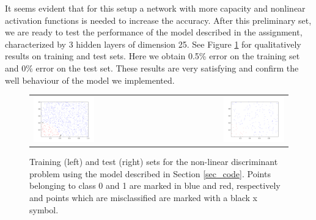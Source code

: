 \documentclass{article}
\begin{document}
It seems evident that for this setup a network with more capacity and nonlinear activation functions is needed to increase the accuracy.
After this preliminary set, we are ready to test the performance of  the model described in the assignment, characterized by 3 hidden layers of dimension 25. See Figure \ref{fig_circle_good} for qualitatively results on training and test sets.
Here we obtain 0.5\% error on the training set and 0\% error on the test set.
These results are very satisfying and confirm the well behaviour of the model we implemented. 
  \begin{figure}[h]
 \begin{center}
\begin{tabular}{l r}
  \includegraphics[width=0.5\textwidth]{fig/fig_circ_ourmodel_05err_train} & 
  \includegraphics[width=0.5\textwidth]{fig/fig_circ_ourmodel_0err_test} \\
  \end{tabular}
   \caption{Training (left) and test (right) sets for the non-linear discriminant problem using the model described in Section \ref{sec_code}. Points belonging to class 0 and 1 are marked in blue and red, respectively and  points which are misclassified are marked with a black x symbol.  \label{fig_circle_good}}
  \end{center}
  \end{figure}

\end{document}
